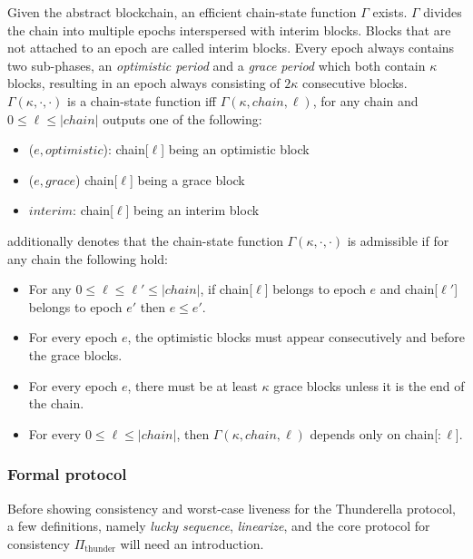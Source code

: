 Given the abstract blockchain, an efficient chain-state function $\Gamma$ exists. $\Gamma$ divides the chain into multiple epochs interspersed with interim blocks. Blocks that are not attached to an epoch are called interim blocks. Every epoch always contains two sub-phases, an \emph{optimistic period} and a \emph{grace period} which both contain $\kappa$ blocks, resulting in an epoch always consisting of $2\kappa$ consecutive blocks.
$\Gamma(\kappa, \cdot, \cdot)$ is a chain-state function iff $\Gamma(\kappa, chain, \ell)$, for any chain and $0 \leq \ell \leq |chain|$ outputs one of the following:
\begin{itemize}
    \item ($e, optimistic$): chain[$\ell$] being an optimistic block
    \item ($e, grace$) chain[$\ell$] being a grace block
    \item $interim$: chain[$\ell$] being an interim block
\end{itemize}

\cite{thunderella} additionally denotes that the chain-state function $\Gamma(\kappa, \cdot, \cdot)$ is admissible if for any chain the following hold:
\begin{itemize}
    \item For any $0 \leq \ell \leq \ell' \leq |chain|$, if chain[$\ell$] belongs to epoch $e$ and chain[$\ell'$] belongs to epoch $e'$ then $e \leq e'$.
    \item For every epoch $e$, the optimistic blocks must appear consecutively and before the grace blocks.
    \item For every epoch $e$, there must be at least $\kappa$ grace blocks unless it is the end of the chain.
    \item For every $0 \leq \ell \leq |chain|$, then $\Gamma(\kappa, chain, \ell)$ depends only on chain[$:\ell$].
\end{itemize}


\subsubsection*{Formal protocol}


Before showing consistency and worst-case liveness for the Thunderella protocol, a few definitions, namely \emph{lucky sequence}, \emph{linearize}, and the core protocol for consistency $\Pi_{\text{thunder}}$ will need an introduction.\\

